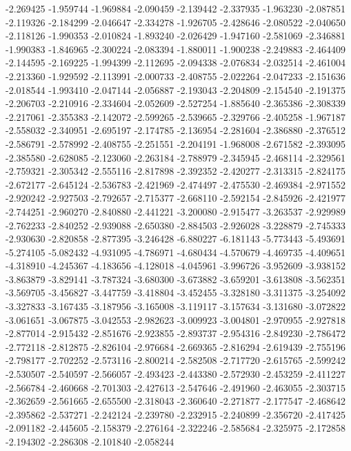 -2.269425
-1.959744
-1.969884
-2.090459
-2.139442
-2.337935
-1.963230
-2.087851
-2.119326
-2.184299
-2.046647
-2.334278
-1.926705
-2.428646
-2.080522
-2.040650
-2.118126
-1.990353
-2.010824
-1.893240
-2.026429
-1.947160
-2.581069
-2.346881
-1.990383
-1.846965
-2.300224
-2.083394
-1.880011
-1.900238
-2.249883
-2.464409
-2.144595
-2.169225
-1.994399
-2.112695
-2.094338
-2.076834
-2.032514
-2.461004
-2.213360
-1.929592
-2.113991
-2.000733
-2.408755
-2.022264
-2.047233
-2.151636
-2.018544
-1.993410
-2.047144
-2.056887
-2.193043
-2.204809
-2.154540
-2.191375
-2.206703
-2.210916
-2.334604
-2.052609
-2.527254
-1.885640
-2.365386
-2.308339
-2.217061
-2.355383
-2.142072
-2.599265
-2.539665
-2.329766
-2.405258
-1.967187
-2.558032
-2.340951
-2.695197
-2.174785
-2.136954
-2.281604
-2.386880
-2.376512
-2.586791
-2.578992
-2.408755
-2.251551
-2.204191
-1.968008
-2.671582
-2.393095
-2.385580
-2.628085
-2.123060
-2.263184
-2.788979
-2.345945
-2.468114
-2.329561
-2.759321
-2.305342
-2.555116
-2.817898
-2.392352
-2.420277
-2.313315
-2.824175
-2.672177
-2.645124
-2.536783
-2.421969
-2.474497
-2.475530
-2.469384
-2.971552
-2.920242
-2.927503
-2.792657
-2.715377
-2.668110
-2.592154
-2.845926
-2.421977
-2.744251
-2.960270
-2.840880
-2.441221
-3.200080
-2.915477
-3.263537
-2.929989
-2.762233
-2.840252
-2.939088
-2.650380
-2.884503
-2.926028
-3.228879
-2.745333
-2.930630
-2.820858
-2.877395
-3.246428
-6.880227
-6.181143
-5.773443
-5.493691
-5.274105
-5.082432
-4.931095
-4.786971
-4.680434
-4.570679
-4.469735
-4.409651
-4.318910
-4.245367
-4.183656
-4.128018
-4.045961
-3.996726
-3.952609
-3.938152
-3.863879
-3.829141
-3.787324
-3.680300
-3.673882
-3.659201
-3.613808
-3.562351
-3.569705
-3.456827
-3.447759
-3.418804
-3.452455
-3.328180
-3.311375
-3.254092
-3.327833
-3.167435
-3.187956
-3.165008
-3.119117
-3.157634
-3.131680
-3.072822
-3.061651
-3.067875
-3.042553
-2.982623
-3.009923
-3.004801
-2.970955
-2.927818
-2.877014
-2.915432
-2.851676
-2.923855
-2.893737
-2.954316
-2.849230
-2.786472
-2.772118
-2.812875
-2.826104
-2.976684
-2.669365
-2.816294
-2.619439
-2.755196
-2.798177
-2.702252
-2.573116
-2.800214
-2.582508
-2.717720
-2.615765
-2.599242
-2.530507
-2.540597
-2.566057
-2.493423
-2.443380
-2.572930
-2.453259
-2.411227
-2.566784
-2.460668
-2.701303
-2.427613
-2.547646
-2.491960
-2.463055
-2.303715
-2.362659
-2.561665
-2.655500
-2.318043
-2.360640
-2.271877
-2.177547
-2.468642
-2.395862
-2.537271
-2.242124
-2.239780
-2.232915
-2.240899
-2.356720
-2.417425
-2.091182
-2.445605
-2.158379
-2.276164
-2.322246
-2.585684
-2.325975
-2.172858
-2.194302
-2.286308
-2.101840
-2.058244
